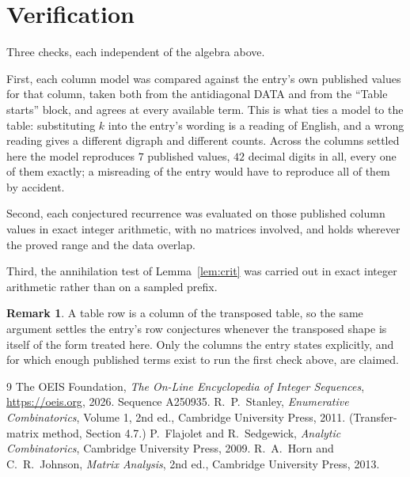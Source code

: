 \documentclass[11pt,a4paper]{article}
\theoremstyle{plain}
\theoremstyle{definition}
\newtheorem{remark}[theorem]{Remark}
\begin{document}
\section{Verification}

Three checks, each independent of the algebra above.

First, each column model was compared against the entry's own published values for that
column, taken both from the antidiagonal DATA and from the ``Table starts'' block, and agrees
at every available term. This is what ties a model to the table: substituting $k$ into the
entry's wording is a reading of English, and a wrong reading gives a different digraph and
different counts. Across the columns settled here the model reproduces $7$ published
values, $42$ decimal digits in all, every one of them exactly; a misreading of the entry
would have to reproduce all of them by accident.

Second, each conjectured recurrence was evaluated on those published column values in exact
integer arithmetic, with no matrices involved, and holds wherever the proved range and the
data overlap.

Third, the annihilation test of Lemma~\ref{lem:crit} was carried out in exact integer
arithmetic rather than on a sampled prefix.

\begin{remark}
A table row is a column of the transposed table, so the same argument settles the entry's row
conjectures whenever the transposed shape is itself of the form treated here. Only the columns
the entry states explicitly, and for which enough published terms exist to run the first check
above, are claimed.
\end{remark}

\begin{thebibliography}{9}
 The OEIS Foundation, \emph{The On-Line Encyclopedia of Integer
Sequences}, \url{https://oeis.org}, 2026. Sequence A250935.
 R.~P.~Stanley, \emph{Enumerative Combinatorics}, Volume 1, 2nd ed.,
Cambridge University Press, 2011. (Transfer-matrix method, Section 4.7.)
 P.~Flajolet and R.~Sedgewick, \emph{Analytic Combinatorics}, Cambridge
University Press, 2009.
 R.~A.~Horn and C.~R.~Johnson, \emph{Matrix Analysis}, 2nd ed., Cambridge
University Press, 2013.
\end{thebibliography}
\end{document}
